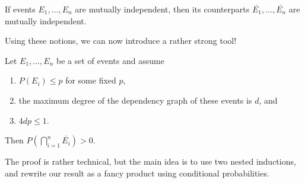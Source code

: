 \begin{lemma}
    If events $E_1, \dots, E_n$ are mutually independent, then its counterparts $\overline{E_1}, \dots, \overline{E_n}$ are mutually independent.
\end{lemma}
Using these notions, we can now introduce a rather strong tool!
\begin{theorem}
    \label{thm:lll}
    Let $E_1, \dots, E_n$ be a set of events and assume
    \begin{enumerate}
        \item $P(E_i) \leq p$ for some fixed $p$,
        \item the maximum degree of the dependency graph of these events is $d$, and
        \item $4dp \leq 1$.
    \end{enumerate}
    Then $P(\bigcap_{i=1}^n \overline{E_i}) > 0$.
\end{theorem}
The proof is rather technical, but the main idea is to use two nested inductions,
and rewrite our result as a fancy product using conditional probabilities.
